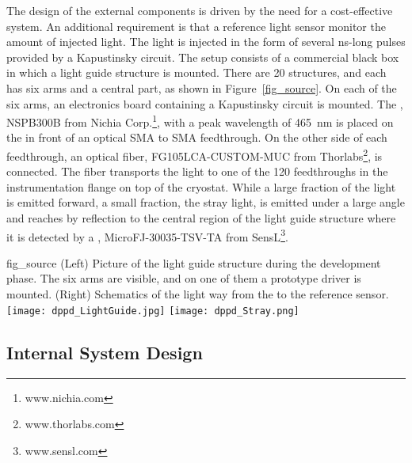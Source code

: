 The design of the external components is driven by the need for a cost-effective system. An additional requirement is that a reference light sensor monitor the amount of injected light. The light is injected in the form of several \si{\ns}-long pulses provided by a Kapustinsky circuit. The setup consists of a commercial black box in which a light guide structure is mounted. There are \num{20} structures, and each has six arms and a central part, as shown in Figure~\ref{fig_source}. On each of the six arms, an electronics board containing a Kapustinsky circuit is mounted. The , NSPB300B from Nichia Corp.\footnote{www.nichia.com}, with a peak wavelength of \SI{465}{nm} is placed  on the  in front of an optical SMA to SMA  feedthrough. On the other side of each feedthrough, an optical fiber, FG105LCA-CUSTOM-MUC from Thorlabs\footnote{www.thorlabs.com}, is connected. The fiber transports the light to one of the \num{120} feedthroughs in the instrumentation flange on top of the cryostat. While a large fraction of the  light is emitted forward, a small fraction, the stray light, is emitted under a large angle and reaches by reflection to the central region of the light guide structure where it is detected by a , MicroFJ-30035-TSV-TA from SensL\footnote{www.sensl.com}.


\begin{dunefigure}{fig_source}
{(Left) Picture of the light guide structure during the development phase. The six arms are visible, and on one of them a prototype  driver is mounted. (Right) Schematics of the light way from the  to the reference sensor.}
\texttt{[image: dppd\_LightGuide.jpg]}
\texttt{[image: dppd\_Stray.png]}
\end{dunefigure}




\subsection{Internal System Design}

